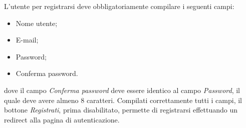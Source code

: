 L'utente per registrarsi deve obbligatoriamente compilare i seguenti campi:
\begin{itemize}
	\item Nome utente;
	\item E-mail;
	\item Password;
	\item Conferma password.
\end{itemize}
dove il campo \textit{Conferma password} deve essere identico al campo \textit{Password}, il quale deve avere almeno 8 caratteri. Compilati correttamente tutti i campi, il bottone \textit{Registrati}, prima disabilitato, permette di registrarsi effettuando un redirect alla pagina di autenticazione.  